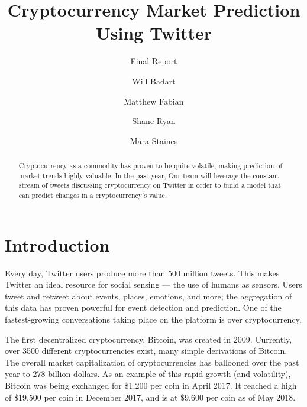 \documentclass[sigconf]{acmart}
\begin{document}
\renewcommand\footnotetextcopyrightpermission[1]{} %
\pagestyle{plain} %

\title{Cryptocurrency Market Prediction Using Twitter}
\subtitle{Final Report}

\author{Will Badart}

\author{Matthew Fabian}

\author{Shane Ryan}

\author{Mara Staines}


\begin{abstract}
Cryptocurrency as a commodity has proven to be quite volatile, making prediction of market trends highly valuable. In the past year, Our team will leverage the constant stream of tweets discussing cryptocurrency on Twitter in order to build a model that can predict changes in a cryptocurrency's value.
\end{abstract}

\maketitle


\section{Introduction}
Every day, Twitter users produce more than 500 million tweets\cite{sayce}. This makes Twitter an ideal resource for social sensing --- the use of humans as sensors. Users tweet and retweet about events, places, emotions, and more; the aggregation of this data has proven powerful for event detection and prediction. One of the fastest-growing conversations taking place on the platform is over cryptocurrency.

The first decentralized cryptocurrency, Bitcoin, was created in 2009. Currently, over 3500 different cryptocurrencies exist, many simple derivations of Bitcoin. The overall market capitalization of cryptocurrencies has ballooned over the past year to 278 billion dollars. As an example of this rapid growth (and volatility), Bitcoin was being exchanged for \$1,200 per coin in April 2017. It reached a high of \$19,500 per coin in December 2017, and is at \$9,600 per coin as of May 2018.
\end{document}
